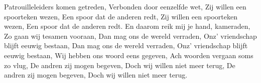 \beginverse*
Patrouilleleiders komen getreden,
Verbonden door eenzelfde wet,
Zij willen een spoorteken wezen,
Een spoor dat de anderen redt,
Zij willen een spoorteken wezen,
Een spoor dat de anderen redt.
\endverse
\beginverse*
En daarom reik mij je hand, kameraden,
Zo gaan wij tesamen vooraan,
Dan mag ons de wereld verraden,
Onz’ vriendschap blijft eeuwig bestaan,
Dan mag ons de wereld verraden,
Onz’ vriendschap blijft eeuwig bestaan,
\endverse
\beginverse*
Wij hebben ons woord eens gegeven, 
Ach woorden vergaan soms zo vlug,
De andren zij mogen begeven,
Doch wij willen niet meer terug,
De andren zij mogen begeven,
Doch wij willen niet meer terug.
\endverse
\endsong 